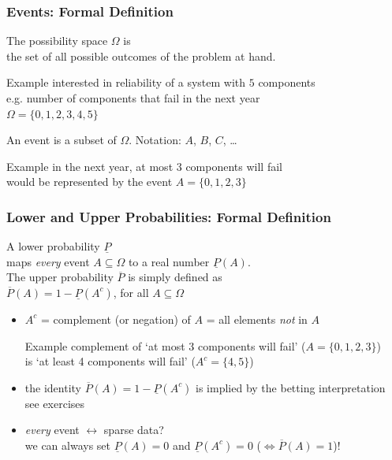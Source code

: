 \documentclass{beamer}
\newcommand{\lpr}{\underline{P}}
\newcommand{\upr}{\overline{P}}
\begin{document}
\begin{frame}
  \frametitle{Events: Formal Definition}
  \begin{definition}
    The \alert{possibility space} $\Omega$ is \\
    the set of all possible outcomes of the problem at hand.
  \end{definition}
  \begin{exampleblock}{Example}
    interested in reliability of a system with $5$ components \\
    e.g. number of components that fail in the next year \\
    $\Omega=\{0,1,2,3,4,5\}$
  \end{exampleblock}
  \begin{definition}
    An \alert{event} is a subset of $\Omega$.
    \hspace{2em}
    Notation: $A$, $B$, $C$, \dots
  \end{definition}
  \begin{exampleblock}{Example}
    in the next year, at most 3 components will fail
    \\
    would be represented by the event $A=\{0,1,2,3\}$
  \end{exampleblock}
\end{frame}

\begin{frame}
  \frametitle{Lower and Upper Probabilities: Formal Definition}
  \begin{definition}
    A \alert{lower probability} $\lpr$
    \\
    maps
    \textit{every}
    event $A\subseteq\Omega$ to a real number $\lpr(A)$.
    \\[1ex]
    The \alert{upper probability} $\upr$ is simply defined as \\
    $\upr(A)=1-\lpr(A^c)$, for all $A\subseteq\Omega$
  \end{definition}
  \begin{itemize}
  \item $A^c$ = \alert{complement} (or \alert{negation}) of $A$ = all elements {\it not} in $A$
  \begin{exampleblock}{Example}
    complement of `at most 3 components will fail' ($A=\{0,1,2,3\}$)
    \\ is `at least 4 components will fail' ($A^c=\{4,5\}$)
  \end{exampleblock}
  \item the identity $\upr(A)=1-\lpr(A^c)$ is implied
    by the betting interpretation \\
    {\scriptsize \hfill see exercises}
  \item \textit{every} event $\leftrightarrow$ sparse data? \\
    we can always set $\lpr(A)=0$ and $\lpr(A^c)=0$ ($\iff\upr(A)=1$)!
  \end{itemize}
\end{frame}
\end{document}
